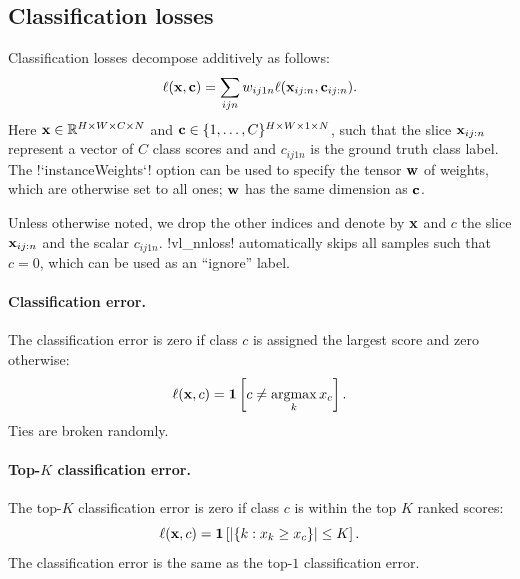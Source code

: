 \subsection{Classification losses}\label{s:loss-classification}

Classification losses decompose additively as follows:
\begin{equation}\label{e:addloss}	
\ell(\mathbf{x},\mathbf{c}) = \sum_{ijn} w_{ij1n} \ell(\mathbf{x}_{ij:n}, \mathbf{c}_{ij:n}).
\end{equation}
Here $\mathbf{x} \in \mathbb{R}^{H \times W \times C \times N}$ and $\mathbf{c} \in \{1, \dots, C\}^{H \times W \times 1 \times N}$, such that the slice $\mathbf{x}_{ij:n}$ represent a vector of $C$ class scores and and $c_{ij1n}$ is the ground truth class label. The !`instanceWeights`! option can be used to specify the tensor $\mathbf{w}$ of weights, which are otherwise set to all ones; $\mathbf{w}$ has the same dimension as $\mathbf{c}$.

Unless otherwise noted, we drop the other indices and denote by $\mathbf{x}$ and $c$  the slice $\mathbf{x}_{ij:n}$ and the scalar $c_{ij1n}$. !vl_nnloss! automatically skips all samples such that $c=0$, which can be used as an ``ignore'' label.

\paragraph{Classification error.} The classification error is zero if class $c$ is assigned the largest score and zero otherwise:
\begin{equation}\label{e:loss-classerror}	
\ell(\bx,c) = \mathbf{1}\left[c \not= \argmax_k x_c\right].
\end{equation}
Ties are broken randomly.

\paragraph{Top-$K$ classification error.} The top-$K$ classification error is zero if class $c$ is within the top $K$ ranked scores:
\begin{equation}\label{e:loss-classerror}	
\ell(\mathbf{x},c) = \mathbf{1}\left[ |\{k : x_k \geq x_c \}| \leq K \right].
\end{equation}
The classification error is the same as the top-$1$ classification error.

